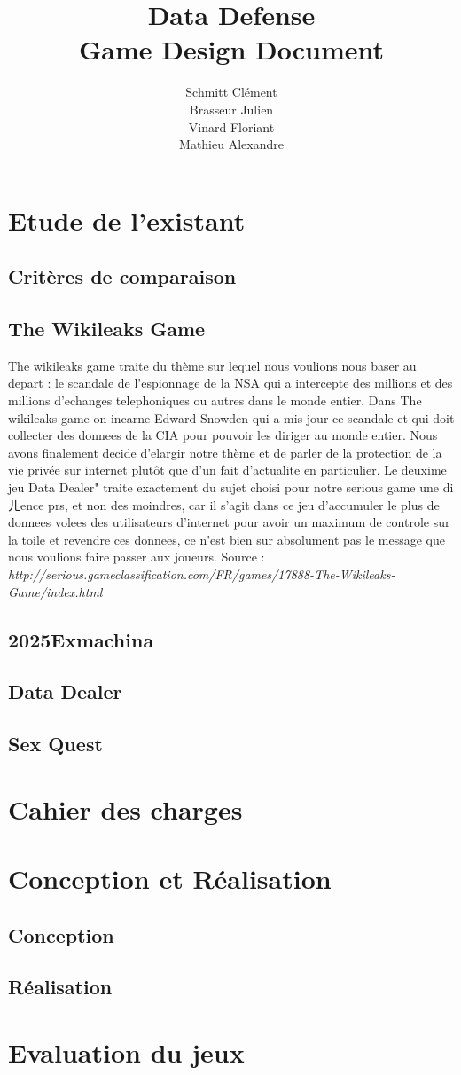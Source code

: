 \documentclass[a4paper]{report}
\title{Data Defense \\ Game Design Document}
\author{Schmitt Clément \\ Brasseur Julien \\ Vinard Floriant \\ Mathieu Alexandre}
\begin{document}
\maketitle

\tableofcontents

\chapter{Etude de l'existant}
\section{Critères de comparaison}
\section{The Wikileaks Game}
The wikileaks game traite du thème sur lequel nous voulions nous baser au
depart : le scandale de l'espionnage de la NSA qui a intercepte des millions et
des millions d'echanges telephoniques ou autres dans le monde entier. Dans The
wikileaks game on incarne Edward Snowden qui a mis  jour ce scandale et qui
doit collecter des donnees de la CIA pour pouvoir les diriger au monde entier.
Nous avons finalement decide d'elargir notre thème et de parler de la protection
de la vie privée sur internet plutôt que d'un fait d'actualite en particulier.
Le deuxime jeu Data Dealer" traite exactement du sujet choisi pour notre
serious game  une diㄦence prs, et non des moindres, car il s'agit dans ce jeu
d'accumuler le plus de donnees volees  des utilisateurs d'internet pour avoir
un maximum de controle sur la toile et revendre ces donnees, ce n'est bien sur
absolument pas le message que nous voulions faire passer aux joueurs.
Source :
\textit{http://serious.gameclassification.com/FR/games/17888-The-Wikileaks-
Game/index.html}
\section{2025Exmachina}
\section{Data Dealer}
\section{Sex Quest}

\chapter{Cahier des charges}

\chapter{Conception et Réalisation}
\section{Conception}
\section{Réalisation}

\chapter{Evaluation du jeux}
\end{document}
